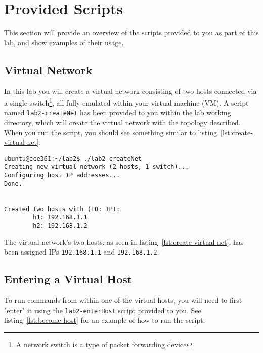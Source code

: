 \documentclass[11pt]{article}
\begin{document}
\section{Provided Scripts}
\label{sec:provided-scripts}
This section will provide an overview of the scripts provided to you as part of this lab, and show examples of their usage.

\subsection{Virtual Network}
In this lab you will create a virtual network consisting of two hosts connected via a single switch\footnote{A network switch is a type of packet forwarding device}, all fully emulated within your virtual machine (VM).
A script named \texttt{lab2-createNet} has been provided to you within the lab working directory, which will create the virtual network with the topology described.
When you run the script, you should see something similar to listing~\ref{lst:create-virtual-net}.

\begin{lstlisting}[style=ece361shell, caption={Creating the virtual network.}, label={lst:create-virtual-net}]
ubuntu@ece361:~/lab2$ ./lab2-createNet
Creating new virtual network (2 hosts, 1 switch)...
Configuring host IP addresses...
Done.


Created two hosts with (ID: IP):
        h1: 192.168.1.1
        h2: 192.168.1.2

\end{lstlisting}

The virtual network's two hosts, as seen in listing~\ref{lst:create-virtual-net}, has been assigned IPs \texttt{192.168.1.1} and \texttt{192.168.1.2}.

\subsection{Entering a Virtual Host}
To run commands from within one of the virtual hosts, you will need to first "enter" it using the \texttt{lab2-enterHost} script provided to you.
See listing~\ref{lst:become-host} for an example of how to run the script.
\end{document}

